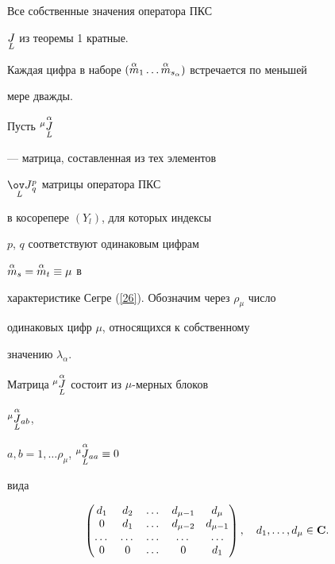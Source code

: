 \begin{cor}


Все собственные значения оператора ПКС


$\underset{L}{J}$ из теоремы 1 кратные.


Каждая цифра в наборе $(\up{\alpha}{m}{}_1\dotsc


\up{\alpha}{m}{}_{s_\alpha})$ встречается по меньшей


мере дважды.


\end{cor}





Пусть ${}^\mu\overset{\alpha}{\underset{L}{J}}$


--- матрица, составленная из тех элементов


${\down{L}{\ov J}}{}^p_q$ матрицы оператора ПКС


в косорепере $(Y_l)$, для которых индексы


$p$, $q$ соответствуют одинаковым цифрам


$\overset{\alpha}{m}_s=\overset{\alpha}{m}_t\equiv \mu$ в


характеристике Сегре (\ref{26}). Обозначим через $\rho_{\mu}$ число


одинаковых цифр $\mu$, относящихся к собственному


значению $\lambda_{\alpha}.$


Матрица ${}^\mu\overset{\alpha}{\underset{L}{J}}$ состоит из $\mu$-мерных блоков


${{}^\mu\overset{\alpha}{\underset{L}{J}}}{}_{ab}$,


$a,b=1,\dotsc \rho_\mu$, ${{}^\mu\overset{\alpha}{\underset{L}{J}}}{}_{aa}\equiv 0$


вида


\begin{equation} \label{33}


\begin{pmatrix}


d_1 & d_2 & \dotsc & d_{\mu-1} & d_\mu \\


0 & d_1 & \dotsc & d_{\mu-2} & d_{\mu-1}\\


\dotsc & \dotsc & \dotsc & \dotsc & \dotsc \\


0 & 0 & \dotsc & 0 & d_1


\end{pmatrix}


, \quad


d_1,\dotsc,d_{\mu}\in \bold C.


\end{equation}





